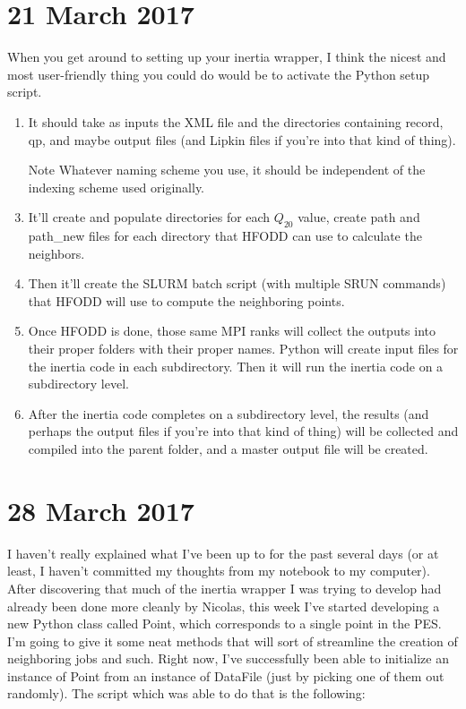 \documentclass[]{report}
\begin{document}
\section*{21 March 2017}
When you get around to setting up your inertia wrapper, I think the nicest and most user-friendly thing you could do would be to activate the Python setup script.

\begin{enumerate}
\item It should take as inputs the XML file and the directories containing record, qp, and maybe output files (and Lipkin files if you're into that kind of thing).
\item[Note] Whatever naming scheme you use, it should be independent of the indexing scheme used originally.
\item It'll create and populate directories for each $Q_{20}$ value, create path and path\_new files for each directory that HFODD can use to calculate the neighbors.
\item Then it'll create the SLURM batch script (with multiple SRUN commands) that HFODD will use to compute the neighboring points.
\item Once HFODD is done, those same MPI ranks will collect the outputs into their proper folders with their proper names. Python will create input files for the inertia code in each subdirectory. Then it will run the inertia code on a subdirectory level.
\item After the inertia code completes on a subdirectory level, the results (and perhaps the output files if you're into that kind of thing) will be collected and compiled into the parent folder, and a master output file will be created.
\end{enumerate}  

\section*{28 March 2017}
I haven't really explained what I've been up to for the past several days (or at least, I haven't committed my thoughts from my notebook to my computer). After discovering that much of the inertia wrapper I was trying to develop had already been done more cleanly by Nicolas, this week I've started developing a new Python class called Point, which corresponds to a single point in the PES. I'm going to give it some neat methods that will sort of streamline the creation of neighboring jobs and such. Right now, I've successfully been able to initialize an instance of Point from an instance of DataFile (just by picking one of them out randomly). The script which was able to do that is the following:
\end{document}
